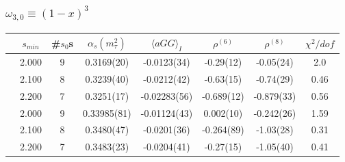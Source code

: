 \documentclass[fleqn]{beamer}
\begin{document}
\begin{frame}
  \frametitle{\(\omega_{3,0} \equiv (1-x)^3\)}
  \begin{adjustbox}{max width=\textwidth}
    \begin{tabular}{cccccccc}
      \toprule
      & \(s_{min}\) & \#\(s_0\)s & \(\alpha_s(m_\tau^2)\) & \(\langle aGG \rangle_I\) & \(\rho^{(6)}\) & \(\rho^{(8)}\) & \(\chi^2/dof\)  \\
      \midrule
      \parbox[t]{2mm}{}
      & 2.000 & 9 & 0.3169(20) & -0.0123(34) & -0.29(12) & -0.05(24) & 2.0 \\
      & 2.100 & 8 & 0.3239(40) & -0.0212(42) & -0.63(15) & -0.74(29) & 0.46 \\
      & 2.200 & 7 & 0.3251(17) & -0.02283(56) & -0.689(12) & -0.879(33) & 0.56 \\
      \midrule
      \parbox[t]{2mm}{}
      & 2.000 & 9  & 0.33985(81) & -0.01124(43) & 0.002(10) & -0.242(26) & 1.59 \\
      & 2.100 & 8  & 0.3480(47) & -0.0201(36) & -0.264(89) & -1.03(28) & 0.31 \\
      & 2.200 & 7  & 0.3483(23) & -0.0204(41) & -0.27(15) & -1.05(40) & 0.41 \\
      \bottomrule
    \end{tabular}
  \end{adjustbox}
\end{frame}
\end{document}
